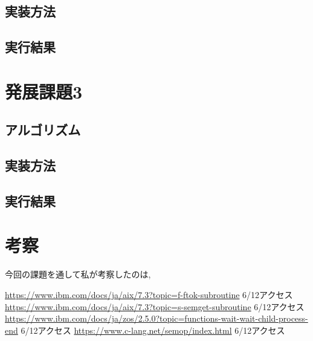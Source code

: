 \documentclass[dvipdfmx]{jarticle}
\begin{document}
\subsection{実装方法}

\subsection{実行結果}
\section{発展課題3}
\subsection{アルゴリズム}

\subsection{実装方法}

\subsection{実行結果}

\section{考察}
今回の課題を通して私が考察したのは,
\begin{thebibliography}{99}
     \url{https://www.ibm.com/docs/ja/aix/7.3?topic=f-ftok-subroutine} 6/12アクセス
     \url{https://www.ibm.com/docs/ja/aix/7.3?topic=s-semget-subroutine} 6/12アクセス
     \url{https://www.ibm.com/docs/ja/zos/2.5.0?topic=functions-wait-wait-child-process-end} 6/12アクセス
     \url{https://www.c-lang.net/semop/index.html} 6/12アクセス
\end{thebibliography}
\end{document}
